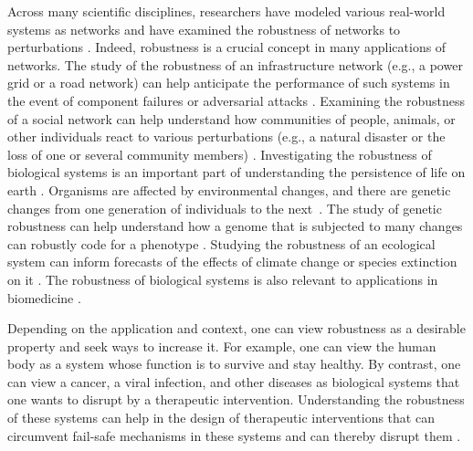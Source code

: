 \documentclass{comnet-mod}
\begin{document}
Across many scientific disciplines, researchers have modeled various real-world systems as networks and have examined the robustness of networks to perturbations \cite{Larhlimi2011, Cuadra2015, Gao2015, Catanese2016, Williams2016, Caccioli2018}. Indeed, robustness is a crucial concept in many applications of networks. The study of the robustness of an infrastructure network (e.g., a power grid or a road network) can help anticipate the performance of such systems in the event of component failures or adversarial attacks \cite{Cuadra2015, Gao2015}. Examining the robustness of a social network can help understand how communities of people, animals, or other individuals react to various perturbations (e.g., a natural disaster or the loss of one or several community members) \cite{Berkes2013, Mourier2017}. Investigating the robustness of biological systems is an important part of understanding the persistence of life on earth \cite{Whitacre2010, Noon2016}. Organisms are affected by environmental changes, and there are genetic changes from one generation of individuals to the next~\cite{Nachman2000}. The study of genetic robustness can help understand how a genome that is subjected to many changes can robustly code for a phenotype \cite{Masel2010, Whitacre2010}. Studying the robustness of an ecological system can inform forecasts of the effects of climate change or species extinction on it \cite{Dunne2002, Schleuning2016}. The robustness of biological systems is also relevant to applications in biomedicine \cite{Kitano2004a}. 

Depending on the application and context, one can view robustness as a desirable property and seek ways to increase it. For example, one can view the human body as a system whose function is to survive and stay healthy. By contrast, one can view a cancer, a viral infection, and other diseases as biological systems that one wants to disrupt by a therapeutic intervention. Understanding the robustness of these systems can help in the design of therapeutic interventions that can circumvent fail-safe mechanisms in these systems and can thereby disrupt them \cite{Kitano2007a}.
\end{document}
